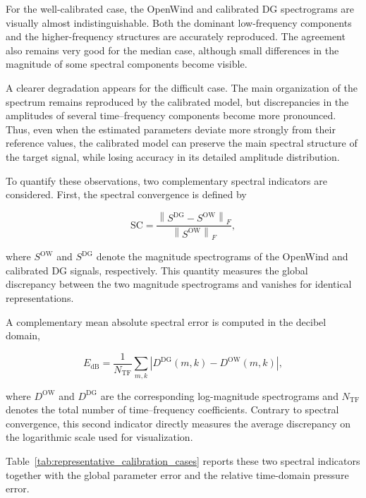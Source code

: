 \documentclass[11pt,a4paper]{report}
\theoremstyle{plain}
\theoremstyle{definition}
\begin{document}
For the well-calibrated case, the OpenWind and calibrated DG spectrograms are
visually almost indistinguishable. Both the dominant low-frequency components
and the higher-frequency structures are accurately reproduced. The agreement
also remains very good for the median case, although small differences in the
magnitude of some spectral components become visible.

A clearer degradation appears for the difficult case. The main organization
of the spectrum remains reproduced by the calibrated model, but discrepancies
in the amplitudes of several time--frequency components become more
pronounced. Thus, even when the estimated parameters deviate more strongly
from their reference values, the calibrated model can preserve the main
spectral structure of the target signal, while losing accuracy in its detailed
amplitude distribution.

To quantify these observations, two complementary spectral indicators are
considered. First, the spectral convergence is defined by

\begin{equation}
\mathrm{SC}
=
\frac{
\left\|
S^{\mathrm{DG}}-S^{\mathrm{OW}}
\right\|_F
}{
\left\|
S^{\mathrm{OW}}
\right\|_F
},
\label{eq:spectral_convergence_representative}
\end{equation}

where $S^{\mathrm{OW}}$ and $S^{\mathrm{DG}}$ denote the magnitude
spectrograms of the OpenWind and calibrated DG signals, respectively.
This quantity measures the global discrepancy between the two magnitude
spectrograms and vanishes for identical representations.

A complementary mean absolute spectral error is computed in the decibel
domain,

\begin{equation}
E_{\mathrm{dB}}
=
\frac{1}{N_{\mathrm{TF}}}
\sum_{m,k}
\left|
D^{\mathrm{DG}}(m,k)
-
D^{\mathrm{OW}}(m,k)
\right|,
\label{eq:spectral_mae_representative}
\end{equation}

where $D^{\mathrm{OW}}$ and $D^{\mathrm{DG}}$ are the corresponding
log-magnitude spectrograms and $N_{\mathrm{TF}}$ denotes the total number of
time--frequency coefficients. Contrary to spectral convergence, this second
indicator directly measures the average discrepancy on the logarithmic scale
used for visualization.

Table~\ref{tab:representative_calibration_cases} reports these two spectral
indicators together with the global parameter error and the relative
time-domain pressure error.
\end{document}
